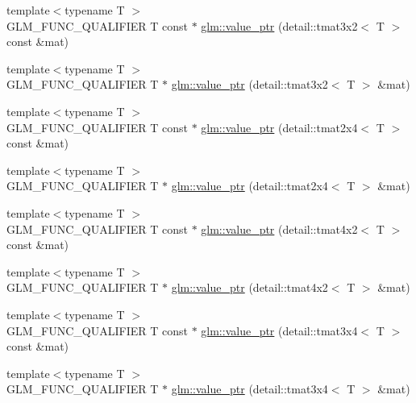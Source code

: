\begin{DoxyCompactItemize}
\item 
{\footnotesize template$<$typename T $>$ }\\G\+L\+M\+\_\+\+F\+U\+N\+C\+\_\+\+Q\+U\+A\+L\+I\+F\+I\+E\+R T const $\ast$ \hyperlink{group__gtc__type__ptr_gad58ae53d7a86bf7caadd7f1be2db3f1a}{glm\+::value\+\_\+ptr} (detail\+::tmat3x2$<$ T $>$ const \&mat)
\item 
{\footnotesize template$<$typename T $>$ }\\G\+L\+M\+\_\+\+F\+U\+N\+C\+\_\+\+Q\+U\+A\+L\+I\+F\+I\+E\+R T $\ast$ \hyperlink{group__gtc__type__ptr_ga241b3c1e7e747ab934e2c38679fe90a5}{glm\+::value\+\_\+ptr} (detail\+::tmat3x2$<$ T $>$ \&mat)
\item 
{\footnotesize template$<$typename T $>$ }\\G\+L\+M\+\_\+\+F\+U\+N\+C\+\_\+\+Q\+U\+A\+L\+I\+F\+I\+E\+R T const $\ast$ \hyperlink{group__gtc__type__ptr_ga6b5545ede3accc40f90aa05014406bcf}{glm\+::value\+\_\+ptr} (detail\+::tmat2x4$<$ T $>$ const \&mat)
\item 
{\footnotesize template$<$typename T $>$ }\\G\+L\+M\+\_\+\+F\+U\+N\+C\+\_\+\+Q\+U\+A\+L\+I\+F\+I\+E\+R T $\ast$ \hyperlink{group__gtc__type__ptr_gad3ffa3b03348e1c71b509023d0e48436}{glm\+::value\+\_\+ptr} (detail\+::tmat2x4$<$ T $>$ \&mat)
\item 
{\footnotesize template$<$typename T $>$ }\\G\+L\+M\+\_\+\+F\+U\+N\+C\+\_\+\+Q\+U\+A\+L\+I\+F\+I\+E\+R T const $\ast$ \hyperlink{group__gtc__type__ptr_ga8278dac512c3e2c638b6713d63c728bb}{glm\+::value\+\_\+ptr} (detail\+::tmat4x2$<$ T $>$ const \&mat)
\item 
{\footnotesize template$<$typename T $>$ }\\G\+L\+M\+\_\+\+F\+U\+N\+C\+\_\+\+Q\+U\+A\+L\+I\+F\+I\+E\+R T $\ast$ \hyperlink{group__gtc__type__ptr_gab70c3bd4e9be92b0c9b9668744f0b5c8}{glm\+::value\+\_\+ptr} (detail\+::tmat4x2$<$ T $>$ \&mat)
\item 
{\footnotesize template$<$typename T $>$ }\\G\+L\+M\+\_\+\+F\+U\+N\+C\+\_\+\+Q\+U\+A\+L\+I\+F\+I\+E\+R T const $\ast$ \hyperlink{group__gtc__type__ptr_gaa38c5a2be6c64a69e7e5d64b70137e1c}{glm\+::value\+\_\+ptr} (detail\+::tmat3x4$<$ T $>$ const \&mat)
\item 
{\footnotesize template$<$typename T $>$ }\\G\+L\+M\+\_\+\+F\+U\+N\+C\+\_\+\+Q\+U\+A\+L\+I\+F\+I\+E\+R T $\ast$ \hyperlink{group__gtc__type__ptr_ga7a9cf1d2fb02f56ba01e27ad528aac7d}{glm\+::value\+\_\+ptr} (detail\+::tmat3x4$<$ T $>$ \&mat)

\end{DoxyCompactItemize}
